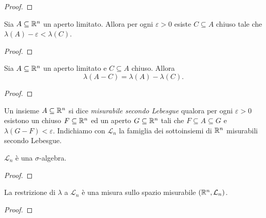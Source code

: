 \begin{proof}
\end{proof}

\begin{proposizione}
Sia \(A \subseteq \mathbb R^n\) un aperto limitato. Allora per ogni \(\varepsilon >0\) esiste \(C \subseteq A\) chiuso tale che \(\lambda(A)-\varepsilon < \lambda(C)\).
\end{proposizione}

\begin{proof}
\end{proof}

\begin{proposizione}
Sia \(A \subseteq \mathbb R^n\) un aperto limitato e \(C \subseteq A\) chiuso. Allora
\[\lambda(A-C) = \lambda(A) - \lambda(C) .\]
\end{proposizione}

\begin{proof}
\end{proof}

\begin{definizione}
Un insieme \(A \subseteq \mathbb R^n\) si dice {\em misurabile secondo Lebesgue} qualora per ogni \(\varepsilon>0\) esistono un chiuso \(F \subseteq \mathbb R^n\) ed un aperto \(G \subseteq \mathbb R^n\) tali che \(F \subseteq A \subseteq G\) e \(\lambda(G-F) < \varepsilon\). Indichiamo con \(\mathcal L_n\) la famiglia dei sottoinsiemi di \(\mathbb R^n\) misurabili secondo Lebesgue.
\end{definizione}

\begin{proposizione}
\(\mathcal L_n\) è una \(\sigma\)-algebra.
\end{proposizione}

\begin{proof}
\end{proof}

\begin{proposizione}
La restrizione di \(\lambda\) a \(\mathcal L_n\) è una misura sullo spazio misurabile \((\mathbb R^n, \mathcal L_n)\).
\end{proposizione}

\begin{proof}
\end{proof}

